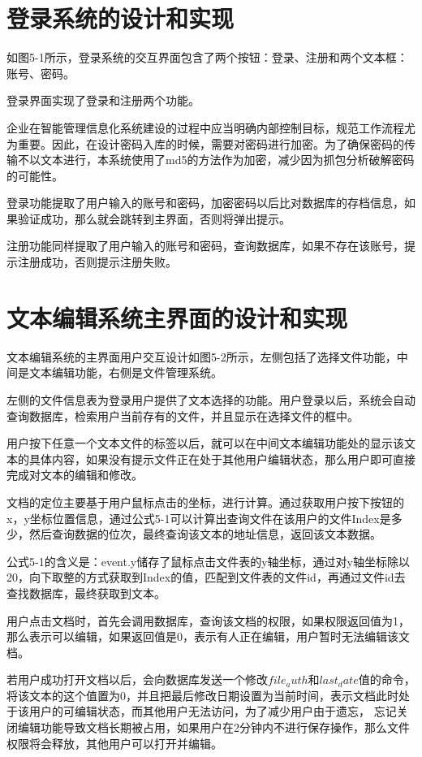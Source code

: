 \documentclass[forprint]{software}
\begin{document}
\section{登录系统的设计和实现}

如图5-1所示，登录系统的交互界面包含了两个按钮：登录、注册和两个文本框：账号、密码。


登录界面实现了登录和注册两个功能。

企业在智能管理信息化系统建设的过程中应当明确内部控制目标，规范工作流程尤为重要。因此，在设计密码入库的时候，需要对密码进行加密。为了确保密码的传输不以文本进行，本系统使用了md5的方法作为加密，减少因为抓包分析破解密码的可能性。

登录功能提取了用户输入的账号和密码，加密密码以后比对数据库的存档信息，如果验证成功，那么就会跳转到主界面，否则将弹出提示。

注册功能同样提取了用户输入的账号和密码，查询数据库，如果不存在该账号，提示注册成功，否则提示注册失败。

\section{文本编辑系统主界面的设计和实现}

文本编辑系统的主界面用户交互设计如图5-2所示，左侧包括了选择文件功能，中间是文本编辑功能，右侧是文件管理系统。

左侧的文件信息表为登录用户提供了文本选择的功能。用户登录以后，系统会自动查询数据库，检索用户当前存有的文件，并且显示在选择文件的框中。

用户按下任意一个文本文件的标签以后，就可以在中间文本编辑功能处的显示该文本的具体内容，如果没有提示文件正在处于其他用户编辑状态，那么用户即可直接完成对文本的编辑和修改。

文档的定位主要基于用户鼠标点击的坐标，进行计算。通过获取用户按下按钮的x，y坐标位置信息，通过公式5-1可以计算出查询文件在该用户的文件Index是多少，然后查询数据的位次，最终查询该文本的地址信息，返回该文本数据。

公式5-1的含义是：event.y储存了鼠标点击文件表的y轴坐标，通过对y轴坐标除以20，向下取整的方式获取到Index的值，匹配到文件表的文件id，再通过文件id去查找数据库，最终获取到文本。


用户点击文档时，首先会调用数据库，查询该文档的权限，如果权限返回值为1，那么表示可以编辑，如果返回值是0，表示有人正在编辑，用户暂时无法编辑该文档。

若用户成功打开文档以后，会向数据库发送一个修改$file_auth$和$last_date$值的命令，将该文本的这个值置为0，并且把最后修改日期设置为当前时间，表示文档此时处于该用户的可编辑状态，而其他用户无法访问，为了减少用户由于遗忘， 忘记关闭编辑功能导致文档长期被占用，如果用户在2分钟内不进行保存操作，那么文件权限将会释放，其他用户可以打开并编辑。
\end{document}
